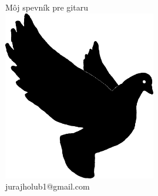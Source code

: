 \documentclass[10pt]{article}
\begin{document}
	
\begin{titlepage}
	\begin{center}
		{\Huge Môj spevník pre gitaru}
		\\
		\medskip \medskip \medskip 
		\includegraphics[width=0.5\textwidth]{pigeon.pdf}
		\\ 
		jurajholub1@gmail.com
	\end{center}
\end{titlepage}

\begin{multicols}{2}
\tableofcontents
\end{multicols}

\newpage
\end{document}
